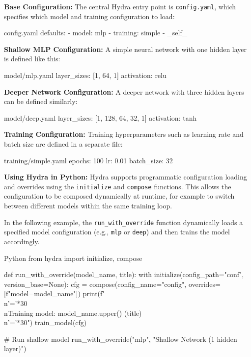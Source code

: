 {\bf Base Configuration:} The central Hydra entry point is \texttt{config.yaml}, which specifies which model and training configuration to load:

\begin{codeonly}{config.yaml}
defaults:
  - model: mlp
  - training: simple
  - _self_
\end{codeonly}

{\bf Shallow MLP Configuration:} A simple neural network with one hidden layer is defined like this:

\begin{codeonly}{model/mlp.yaml}
layer_sizes: [1, 64, 1]
activation: relu
\end{codeonly}

{\bf Deeper Network Configuration:} A deeper network with three hidden layers can be defined similarly:

\begin{codeonly}{model/deep.yaml}
layer_sizes: [1, 128, 64, 32, 1]
activation: tanh
\end{codeonly}

{\bf Training Configuration:} Training hyperparameters such as learning rate and batch size are defined in a separate file:

\begin{codeonly}{training/simple.yaml}
epochs: 100
lr: 0.01
batch_size: 32
\end{codeonly}

{\bf Using Hydra in Python:} Hydra supports programmatic configuration loading and overrides using the \texttt{initialize} and \texttt{compose} functions. This allows the configuration to be composed dynamically at runtime, for example to switch between different models within the same training loop.

In the following example, the \texttt{run\_with\_override} function dynamically loads a specified model configuration (e.g., \texttt{mlp} or \texttt{deep}) and then trains the model accordingly.

\begin{codeonly}{Python}
from hydra import initialize, compose

def run_with_override(model_name, title):
    with initialize(config_path="conf", version_base=None):
        cfg = compose(config_name="config", overrides=[f"model={model_name}"])
    print(f"\\n{'='*30}\\nTraining model: {model_name.upper()} ({title})\\n{'='*30}")
    train_model(cfg)

# Run shallow model
run_with_override("mlp", "Shallow Network (1 hidden layer)")
\end{codeonly}

